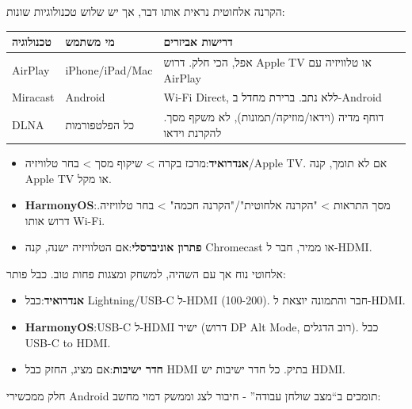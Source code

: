 


הקרנה אלחוטית נראית אותו דבר, אך יש שלוש טכנולוגיות שונות:

\begin{center}
\begin{tabularx}{\linewidth}{|X|X|X|}
\hline
\textbf{טכנולוגיה} & \textbf{מי משתמש} & \textbf{דרישות אביזרים} \tabularnewline
\hline
AirPlay & iPhone/iPad/Mac & אפל, הכי חלק. דרוש Apple TV או טלוויזיה עם AirPlay \tabularnewline
Miracast & Android & Wi-Fi Direct, ללא נתב. ברירת מחדל ב-Android \tabularnewline
DLNA & כל הפלטפורמות & דוחף מדיה (וידאו/מוזיקה/תמונות), לא משקף מסך. להקרנת וידאו \tabularnewline
\hline
\end{tabularx}
\end{center}


\begin{itemize}
  \item \textbf{אנדרואיד}:מרכז בקרה > שיקוף מסך > בחר טלוויזיה/Apple TV. אם לא תומך, קנה Apple TV או מקל.
  \item \textbf{HarmonyOS}:מסך התראות > "הקרנה אלחוטית"/"הקרנה חכמה" > בחר טלוויזיה. דרוש אותו Wi-Fi.
  \item \textbf{פתרון אוניברסלי}:אם הטלוויזיה ישנה, קנה Chromecast או ממיר, חבר ל-HDMI.
\end{itemize}


אלחוטי נוח אך עם השהיה, למשחק ומצגות פחות טוב. כבל פותר:

\begin{itemize}
  \item \textbf{אנדרואיד}:כבל Lightning/USB-C ל-HDMI (100-200). חבר והתמונה יוצאת ל-HDMI.
  \item \textbf{HarmonyOS}:USB-C ל-HDMI ישיר (דרוש DP Alt Mode, רוב הדגלים). כבל USB-C to HDMI.
  \item \textbf{חדר ישיבות}:אם מציג, החזק כבל HDMI בתיק. כל חדר ישיבות יש HDMI.
\end{itemize}


חלק ממכשירי Android תומכים ב“מצב שולחן עבודה” - חיבור לצג וממשק דמוי מחשב:

